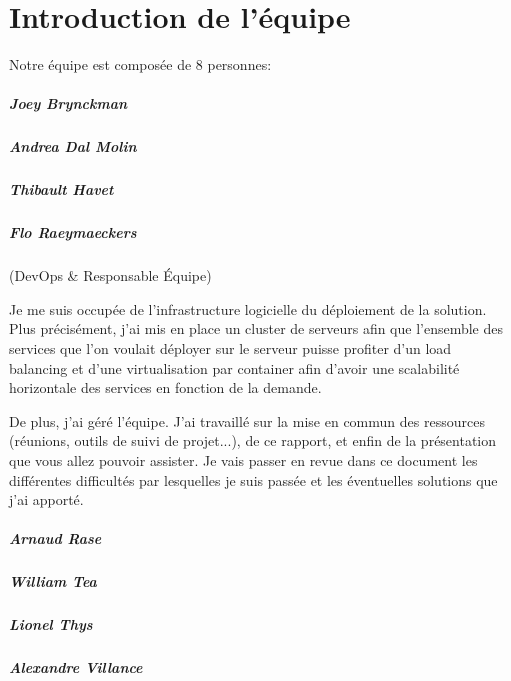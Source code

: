 \chapter{Introduction de l'équipe}

Notre équipe est composée de 8 personnes:

\paragraph{Joey Brynckman}
\paragraph{Andrea Dal Molin}
\paragraph{Thibault Havet}
\paragraph{Flo Raeymaeckers} (DevOps \& Responsable Équipe)

Je me suis occupée de l'infrastructure logicielle du déploiement de la solution. Plus précisément, j'ai mis en place un cluster de serveurs afin que l'ensemble des services que l'on voulait déployer sur le serveur puisse profiter d'un load balancing et d'une virtualisation par container afin d'avoir une scalabilité horizontale des services en fonction de la demande.

De plus, j'ai géré l'équipe. J'ai travaillé sur la mise en commun des ressources (réunions, outils de suivi de projet...), de ce rapport, et enfin de la présentation que vous allez pouvoir assister. Je vais passer en revue dans ce document les différentes difficultés par lesquelles je suis passée et les éventuelles solutions que j'ai apporté.

\paragraph{Arnaud Rase}
\paragraph{William Tea}
\paragraph{Lionel Thys}
\paragraph{Alexandre Villance}

